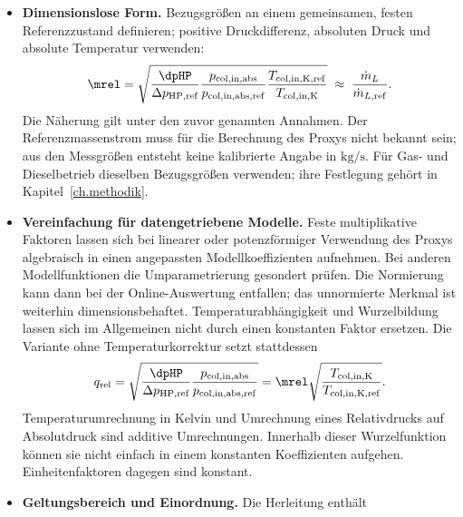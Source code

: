 \begin{itemize}
\begin{equation}
    \end{equation}
    $T_{\mathrm{col,in,K}}$: gemessenes $\Tin$ als absolute Temperatur.
    Die Luft kühlt entlang des Kühlers ab; die Eintrittsdichte ersetzt
    hier den räumlichen Dichteverlauf. Ein anderer repräsentativer
    Zustand verlangt eine dazu passende Druck- und Temperaturzuordnung.
    $\Tout$ im Nenner ist deshalb eine gesondert zu begründende Variante.
  \item \textbf{Dimensionslose Form.} Bezugsgrößen an einem gemeinsamen,
    festen Referenzzustand definieren; positive Druckdifferenz,
    absoluten Druck und absolute Temperatur verwenden:
    \begin{equation}
      \label{eq.luftproxy.relativ}
      \mrel =
      \sqrt{\frac{\dpHP}{\Delta p_{\mathrm{HP,ref}}}
            \frac{p_{\mathrm{col,in,abs}}}{p_{\mathrm{col,in,abs,ref}}}
            \frac{T_{\mathrm{col,in,K,ref}}}{T_{\mathrm{col,in,K}}}}
      \;\approx\;\frac{\dot m_L}{\dot m_{L,\mathrm{ref}}}.
    \end{equation}
    Die Näherung gilt unter den zuvor genannten Annahmen. Der
    Referenzmassenstrom muss für die Berechnung des Proxys nicht bekannt
    sein; aus den Messgrößen entsteht keine kalibrierte Angabe in
    $\mathrm{kg/s}$. Für Gas- und Dieselbetrieb dieselben Bezugsgrößen
    verwenden; ihre Festlegung gehört in Kapitel~\ref{ch.methodik}.
  \item \textbf{Vereinfachung für datengetriebene Modelle.} Feste
    multiplikative Faktoren lassen sich bei linearer oder
    potenzförmiger Verwendung des Proxys algebraisch in einen angepassten
    Modellkoeffizienten aufnehmen. Bei anderen Modellfunktionen die
    Umparametrierung gesondert prüfen. Die Normierung kann dann bei der
    Online-Auswertung entfallen; das unnormierte Merkmal ist weiterhin
    dimensionsbehaftet. Temperaturabhängigkeit und Wurzelbildung lassen
    sich im Allgemeinen nicht durch einen konstanten Faktor ersetzen.
    Die Variante ohne Temperaturkorrektur setzt stattdessen
    \[
      q_{\mathrm{rel}}=
      \sqrt{\frac{\dpHP}{\Delta p_{\mathrm{HP,ref}}}
            \frac{p_{\mathrm{col,in,abs}}}{p_{\mathrm{col,in,abs,ref}}}}
      =\mrel\sqrt{\frac{T_{\mathrm{col,in,K}}}
                            {T_{\mathrm{col,in,K,ref}}}}.
    \]
    Temperaturumrechnung in Kelvin und Umrechnung eines Relativdrucks
    auf Absolutdruck sind additive Umrechnungen. Innerhalb dieser
    Wurzelfunktion können sie nicht einfach in einem konstanten
    Koeffizienten aufgehen. Einheitenfaktoren dagegen sind konstant.
  \item \textbf{Geltungsbereich und Einordnung.} Die Herleitung enthält

\end{itemize}
